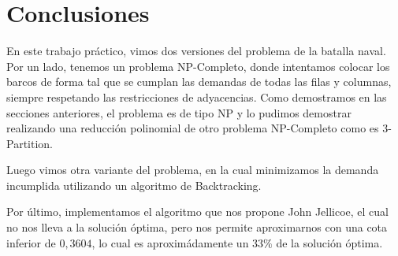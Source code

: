 \section{Conclusiones}

En este trabajo práctico, vimos dos versiones del problema de la batalla naval. Por un lado, tenemos un problema NP-Completo, donde intentamos colocar los barcos de forma tal que se cumplan las demandas de todas las filas y columnas, siempre respetando las restricciones de adyacencias. Como demostramos en las secciones anteriores, el problema es de tipo NP y lo pudimos demostrar realizando una reducción polinomial de otro problema NP-Completo como es 3-Partition.

Luego vimos otra variante del problema, en la cual minimizamos la demanda incumplida utilizando un algoritmo de Backtracking.

Por último, implementamos el algoritmo que nos propone John Jellicoe, el cual no nos lleva a la solución óptima, pero nos permite aproximarnos con una cota inferior de $0,3604$, lo cual es aproximádamente un $33\%$ de la solución óptima.